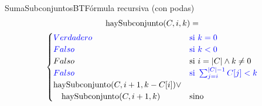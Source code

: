 \documentclass{beamer}
\begin{document}
\begin{frame}{SumaSubconjuntosBT}{Fórmula recursiva (con podas)}
    \begin{multline*}
        \text{haySubconjunto}(C, i, k) = \\\begin{cases}
            \mathcolor{blue}{Verdadero & \text{si } k = 0}\\
            \mathcolor{blue}{Falso & \text{si } k < 0}\\
            Falso & \text{si } i = |C| \land k \neq 0\\
            \mathcolor{blue}{Falso & \text{si } \sum_{j=i}^{|C| - 1} C[j] < k}\\
            \text{haySubconjunto}(C, i+1, k - C[i]) \lor \\\quad\text{haySubconjunto}(C, i+1, k)  & \text{sino}
        \end{cases}   
    \end{multline*}
\end{frame}

\begin{frame}

    
\end{frame}
\end{document}
